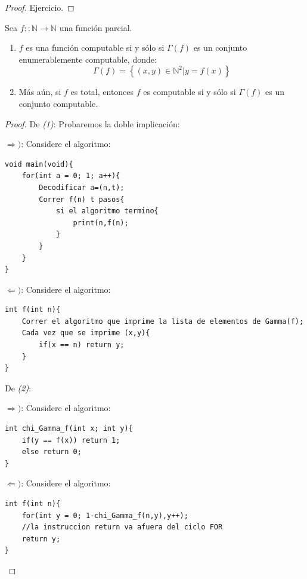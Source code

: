 \documentclass[12pt]{report}
\newcounter{it}
\theoremstyle{largebreak}
\newcommand\cf[3]{\ensuremath{#1:#2\rightarrow#3}}
\begin{document}
    \begin{proof}
        Ejercicio.
    \end{proof}

    \begin{theor}
        Sea $\cf{f}{;\mathbb{N}}{\mathbb{N}}$ una función parcial.
        \begin{enumerate}[label = \textit{(\arabic*)}]
            \item $f$ es una función computable si y sólo si $\Gamma(f)$ es un conjunto enumerablemente computable, donde:
            \begin{equation*}
                \Gamma(f)=\left\{(x,y)\in\mathbb{N}^2\Big|y=f(x) \right\}
            \end{equation*}
            \item Más aún, si $f$ es total, entonces $f$ es computable si y sólo si $\Gamma(f)$ es un conjunto computable.
        \end{enumerate}
    \end{theor}

    \begin{proof}
        De \textit{(1)}: Probaremos la doble implicación:
        
        $\Rightarrow)$: Considere el algoritmo:
        \begin{lstlisting}
void main(void){
    for(int a = 0; 1; a++){
        Decodificar a=(n,t);
        Correr f(n) t pasos{
            si el algoritmo termino{
                print(n,f(n);
            }
        }
    }
}
        \end{lstlisting}

        $\Leftarrow)$: Considere el algoritmo:
        \begin{lstlisting}
int f(int n){
    Correr el algoritmo que imprime la lista de elementos de Gamma(f);
    Cada vez que se imprime (x,y){
        if(x == n) return y;
    }
}
        \end{lstlisting}

        De \textit{(2)}:

        $\Rightarrow)$: Considere el algoritmo:

        \begin{lstlisting}
int chi_Gamma_f(int x; int y){
    if(y == f(x)) return 1;
    else return 0;
}
        \end{lstlisting}

        $\Leftarrow)$: Considere el algoritmo:

        \begin{lstlisting}
int f(int n){
    for(int y = 0; 1-chi_Gamma_f(n,y),y++);
    //la instruccion return va afuera del ciclo FOR
    return y;
}
        \end{lstlisting}

    \end{proof}
\end{document}
